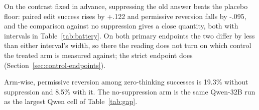 \documentclass[letterpaper]{article} %
\begin{document}
\begin{table}[t!]
\caption{Paired contrasts of the five-arm think-span battery on Qwen-32B at \(B_3\) (arm-wise levels are in Figure~\ref{fig:forest}; effective \(n\) is 198/198/196/199/200 for N/T/D/P/C), the intervention's transfers, and its guard cost; the gap-robustness rows are in the supplement.  \(ES\) is scored on every attempted row, whereas \(RR\) and \(RR^s\) are conditioned on zero-thinking success, so columns rest on different denominators; a paired reversion contrast uses the intersection of the two arms' gate sets, so its denominator is neither arm's \(n\), and paired differences need not equal differences of arm-wise rates.  Bold marks intervals excluding zero.  Intervals are unadjusted for multiplicity.  The in-span leakage check is a manipulation check rather than an outcome.  \(^{\dagger}\)cross-arm paired family; the rest are the mean-CI family, never mixed within a contrast.  The guard rows' \(90\%\) intervals are the two-one-sided-test convention.} %
\label{tab:battery}
\end{table}


On the contrast fixed in advance, suppressing the old answer beats the placebo floor: paired edit success rises by +.122 and permissive reversion falls by -.095, and the comparison against no suppression gives a close quantity, both with intervals in Table~\ref{tab:battery}.  On both primary endpoints the two differ by less than either interval's width, so there the reading does not turn on which control the treated arm is measured against; the strict endpoint does (Section~\ref{sec:control-endpoints}). %

Arm-wise, permissive reversion among zero-thinking successes is 19.3\% without suppression and 8.5\% with it.  The no-suppression arm is the same Qwen-32B run as the largest Qwen cell of Table~\ref{tab:gap}. %
\end{document}
